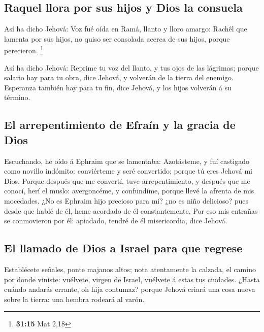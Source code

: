 \hypertarget{raquel-llora-por-sus-hijos-y-dios-la-consuela}{%
\subsection{Raquel llora por sus hijos y Dios la
consuela}\label{raquel-llora-por-sus-hijos-y-dios-la-consuela}}

 Así ha dicho Jehová: Voz fué oída en Ramá, llanto y lloro
amargo: Rachêl que lamenta por sus hijos, no quiso ser consolada acerca
de sus hijos, porque perecieron. \footnote{\textbf{31:15} Mat 2,18}

 Así ha dicho Jehová: Reprime tu voz del llanto, y tus ojos
de las lágrimas; porque salario hay para tu obra, dice Jehová, y
volverán de la tierra del enemigo.  Esperanza también hay
para tu fin, dice Jehová, y los hijos volverán á su término.

\hypertarget{el-arrepentimiento-de-efrauxedn-y-la-gracia-de-dios}{%
\subsection{El arrepentimiento de Efraín y la gracia de
Dios}\label{el-arrepentimiento-de-efrauxedn-y-la-gracia-de-dios}}

 Escuchando, he oído á Ephraim que se lamentaba:
Azotásteme, y fuí castigado como novillo indómito: conviérteme y seré
convertido; porque tú eres Jehová mi Dios.  Porque después
que me convertí, tuve arrepentimiento, y después que me conocí, herí el
muslo: avergoncéme, y confundíme, porque llevé la afrenta de mis
mocedades.  ¿No es Ephraim hijo precioso para mí? ¿no es
niño delicioso? pues desde que hablé de él, heme acordado de él
constantemente. Por eso mis entrañas se conmovieron por él: apiadado,
tendré de él misericordia, dice Jehová.

\hypertarget{el-llamado-de-dios-a-israel-para-que-regrese}{%
\subsection{El llamado de Dios a Israel para que
regrese}\label{el-llamado-de-dios-a-israel-para-que-regrese}}

 Establécete señales, ponte majanos altos; nota atentamente
la calzada, el camino por donde viniste: vuélvete, virgen de Israel,
vuélvete á estas tus ciudades.  ¿Hasta cuándo andarás
errante, oh hija contumaz? porque Jehová criará una cosa nueva sobre la
tierra: una hembra rodeará al varón.

